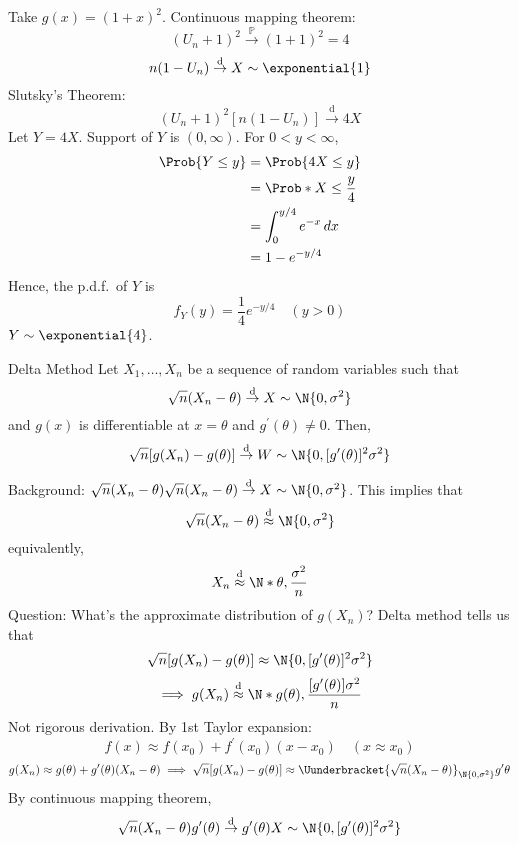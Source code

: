 \begin{Example}{}{}
\begin{enumerate}[label=(\roman*)]
              Take $ g(x)=(1+x)^2 $. Continuous mapping theorem:
              \[ (U_n+1)^2\stackrel{\mathbb{P}}{\to}(1+1)^2=4 \]
              \[ n(1-U_n)\stackrel{\text{d}}{\to}X \sim \exponential{1} \]
              Slutsky's Theorem:
              \[ (U_n+1)^2[n(1-U_n)]\stackrel{\text{d}}{\to}4X \]
              Let $ Y=4X $. Support of $ Y $ is $ (0,\infty) $.
              For $ 0<y<\infty $,
              \begin{align*}
                  \Prob{Y\le y}
                   & =\Prob{4X\le y}               \\
                   & =\Prob*{X\le \frac{y}{4}}     \\
                   & =\int_{0}^{y/4}e^{-x} \, d{x} \\
                   & =1-e^{-y/4}
              \end{align*}
              Hence, the p.d.f.\ of $ Y $ is
              \[ f_Y(y)=\frac{1}{4} e^{-y/4}\quad (y>0) \]
              $ Y \sim \exponential{4} $.
    \end{enumerate}
\end{Example}
\begin{Theorem}{Delta Method}{}
    Let $ X_1,\ldots,X_n $ be a sequence of random variables
    such that
    \[ \sqrt{n}(X_n-\theta)
        \stackrel{\text{d}}{\to}X \sim \N{0,\sigma^2} \]
    and $ g(x) $ is differentiable at $ x=\theta $
    and $ g^{\prime}(\theta)\ne 0 $. Then,
    \[ \sqrt{n}[g(X_n)-g(\theta)]\stackrel{\text{d}}{\to}W \sim \N{0,
            [g^{\prime}(\theta)]^2\sigma^2} \]
\end{Theorem}
Background: $ \sqrt{n}(X_n-\theta)\sqrt{n}(X_n-\theta)
    \stackrel{\text{d}}{\to}X \sim \N{0,\sigma^2} $.
This implies that
\[ \sqrt{n}(X_n-\theta)\stackrel{\text{d}}{\approx}
    \N{0,\sigma^2} \]
equivalently,
\[ X_n\stackrel{\text{d}}{\approx}\N*{\theta,\frac{\sigma^2}{n}} \]
Question: What's the approximate distribution of $ g(X_n) $?
Delta method tells us that
\[ \sqrt{n}[g(X_n)-g(\theta)] \approx\N{0,
        [g^{\prime}(\theta)]^2\sigma^2} \]
\[ \implies g(X_n)\stackrel{\text{d}}{\approx}
    \N*{g(\theta),\frac{[g^\prime(\theta)]\sigma^2}{n} } \]
Not rigorous derivation. By 1st Taylor
expansion:
\[ f(x)\approx f(x_0)+f^\prime(x_0)(x-x_0)\quad (x\approx x_0) \]
\[ g(X_n)\approx g(\theta)+g^\prime(\theta)(X_n-\theta)\implies
    \sqrt{n}[g(X_n)-g(\theta)]\approx
    \Uunderbracket{\sqrt{n}(X_n-\theta)}_{\N{0,\sigma^2}}
    g^\prime \theta \]
By continuous mapping theorem,
\[ \sqrt{n}(X_n-\theta)g^\prime(\theta)
    \stackrel{\text{d}}{\to} g^\prime(\theta)X \sim \N{
        0,[g^\prime(\theta)]^2\sigma^2
    } \]
